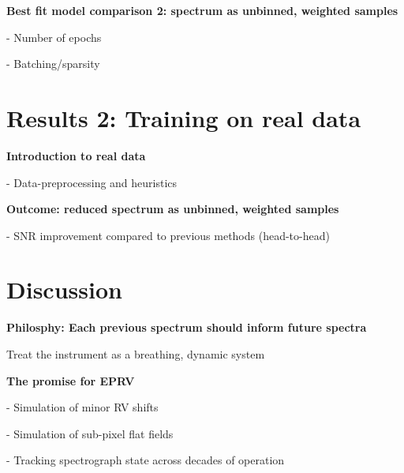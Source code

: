 \documentclass[twocolumn]{aastex631}
\begin{document}
\begin{mdframed}
  \textbf{Best fit model comparison 2: spectrum as unbinned, weighted samples} \par
  - Number of epochs\par
  - Batching/sparsity\par
  \textcolor{lightgray}{\lipsum[11]}
\end{mdframed}


\section{Results 2: Training on real data}
\begin{mdframed}
  \textbf{Introduction to real data} \par
  - Data-preprocessing and heuristics \par
  \textcolor{lightgray}{\lipsum[12]}
\end{mdframed}

\begin{mdframed}
  \textbf{Outcome: reduced spectrum as unbinned, weighted samples} \par
  - SNR improvement compared to previous methods (head-to-head)\par
  \textcolor{lightgray}{\lipsum[13]}
\end{mdframed}

\pagebreak
\clearpage

\section{Discussion}\label{secDiscuss}

\begin{mdframed}
  \textbf{Philosphy: Each previous spectrum should inform future spectra} \par
  Treat the instrument as a breathing, dynamic system\par
  \textcolor{lightgray}{\lipsum[5]}
\end{mdframed}

\begin{mdframed}
  \textbf{The promise for EPRV} \par
  - Simulation of minor RV shifts\par
  - Simulation of sub-pixel flat fields \par
  - Tracking spectrograph state across decades of operation\par
  \textcolor{lightgray}{\lipsum[14]}
\end{mdframed}
\end{document}
